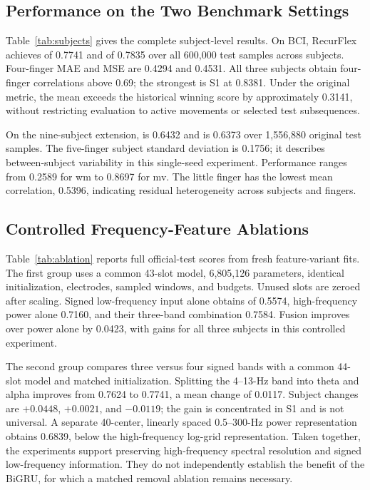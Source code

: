 

\subsection{Performance on the Two Benchmark Settings}
Table~\ref{tab:subjects} gives the complete subject-level results. On BCI, RecurFlex achieves \rFour{} of 0.7741 and \rFive{} of 0.7835 over all 600,000 test samples across subjects. Four-finger MAE and MSE are 0.4294 and 0.4531. All three subjects obtain four-finger correlations above 0.69; the strongest is S1 at 0.8381. Under the original metric, the mean exceeds the historical winning score by approximately 0.3141, without restricting evaluation to active movements or selected test subsequences.

On the nine-subject extension, \rFive{} is 0.6432 and \rFour{} is 0.6373 over 1,556,880 original test samples. The five-finger subject standard deviation is 0.1756; it describes between-subject variability in this single-seed experiment. Performance ranges from 0.2589 for wm to 0.8697 for mv. The little finger has the lowest mean correlation, 0.5396, indicating residual heterogeneity across subjects and fingers.

\subsection{Controlled Frequency-Feature Ablations}
Table~\ref{tab:ablation} reports full official-test scores from fresh feature-variant fits. The first group uses a common 43-slot model, 6,805,126 parameters, identical initialization, electrodes, sampled windows, and budgets. Unused slots are zeroed after scaling. Signed low-frequency input alone obtains \rFour{} of 0.5574, high-frequency power alone 0.7160, and their three-band combination 0.7584. Fusion improves over power alone by 0.0423, with gains for all three subjects in this controlled experiment.

The second group compares three versus four signed bands with a common 44-slot model and matched initialization. Splitting the 4--13-Hz band into theta and alpha improves \rFour{} from 0.7624 to 0.7741, a mean change of 0.0117. Subject changes are $+0.0448$, $+0.0021$, and $-0.0119$; the gain is concentrated in S1 and is not universal. A separate 40-center, linearly spaced 0.5--300-Hz power representation obtains 0.6839, below the high-frequency log-grid representation. Taken together, the experiments support preserving high-frequency spectral resolution and signed low-frequency information. They do not independently establish the benefit of the BiGRU, for which a matched removal ablation remains necessary.

